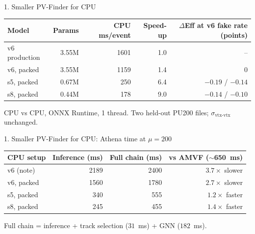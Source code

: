 \begin{frame}{1. Smaller PV-Finder for CPU}
\vspace{.2em}
{\centering\scriptsize
\begin{tabular}{lrrrr}
\toprule
Model & Params & CPU ms/event & Speed-up & $\Delta$Eff at v6 fake rate (points) \\
\midrule
v6 production & 3.55M & 1601 & 1.0 & -- \\
v6, packed & 3.55M & 1159 & 1.4 & 0 \\
s5, packed & 0.67M & 250 & 6.4 & $-0.19$ / $-0.14$ \\
s8, packed & 0.44M & 178 & 9.0 & $-0.14$ / $-0.10$ \\
\bottomrule
\end{tabular}\par}
\vspace{.4em}
{\scriptsize CPU vs CPU, ONNX Runtime, 1 thread. Two held-out PU200 files; $\sigma_\mathrm{vtx\text{-}vtx}$ unchanged.\par}
\end{frame}

\begin{frame}{1. Smaller PV-Finder for CPU: Athena time at $\mu=200$}
\vspace{.3em}
{\centering\small
\begin{tabular}{lrrr}
\toprule
CPU setup & Inference (ms) & Full chain (ms) & vs AMVF ($\sim$650~ms) \\
\midrule
v6 (note) & 2189 & 2400 & $3.7\times$ slower \\
v6, packed & 1560 & 1780 & $2.7\times$ slower \\
s5, packed & 340 & 555 & $1.2\times$ faster \\
s8, packed & 245 & 455 & $1.4\times$ faster \\
\bottomrule
\end{tabular}\par}
\vspace{.4em}
{\scriptsize Full chain = inference + track selection ($31$~ms) + GNN ($182$~ms).\par}
\end{frame}

